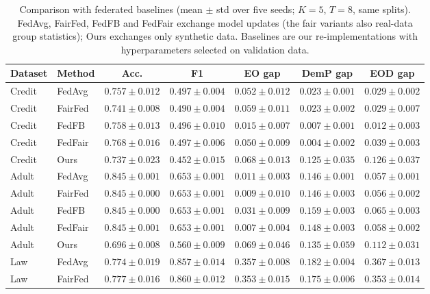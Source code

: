 \begin{table}[!t]
\caption{Comparison with federated baselines (mean \(\pm\) std over five seeds; \(K{=}5\), \(T{=}8\), same splits). FedAvg, FairFed, FedFB and FedFair exchange model updates (the fair variants also real-data group statistics); Ours exchanges only synthetic data. Baselines are our re-implementations with hyperparameters selected on validation data.}
\label{tab:fl-baselines}
\centering
\small
\begin{tabular}{@{}llccccc@{}}
\toprule
\textbf{Dataset} & \textbf{Method} & \textbf{Acc.} & \textbf{F1} & \textbf{EO gap} & \textbf{DemP gap} & \textbf{EOD gap} \\
\midrule
Credit & FedAvg & \(0.757\pm0.012\) & \(0.497\pm0.004\) & \(0.052\pm0.012\) & \(0.023\pm0.001\) & \(0.029\pm0.002\) \\
Credit & FairFed & \(0.741\pm0.008\) & \(0.490\pm0.004\) & \(0.059\pm0.011\) & \(0.023\pm0.002\) & \(0.029\pm0.007\) \\
Credit & FedFB & \(0.758\pm0.013\) & \(0.496\pm0.010\) & \(0.015\pm0.007\) & \(0.007\pm0.001\) & \(0.012\pm0.003\) \\
Credit & FedFair & \(0.768\pm0.016\) & \(0.497\pm0.006\) & \(0.050\pm0.009\) & \(0.004\pm0.002\) & \(0.039\pm0.003\) \\
Credit & Ours & \(0.737\pm0.023\) & \(0.452\pm0.015\) & \(0.068\pm0.013\) & \(0.125\pm0.035\) & \(0.126\pm0.037\) \\
\midrule
Adult & FedAvg & \(0.845\pm0.001\) & \(0.653\pm0.001\) & \(0.011\pm0.003\) & \(0.146\pm0.001\) & \(0.057\pm0.001\) \\
Adult & FairFed & \(0.845\pm0.000\) & \(0.653\pm0.001\) & \(0.009\pm0.010\) & \(0.146\pm0.003\) & \(0.056\pm0.002\) \\
Adult & FedFB & \(0.845\pm0.000\) & \(0.653\pm0.001\) & \(0.031\pm0.009\) & \(0.159\pm0.003\) & \(0.065\pm0.003\) \\
Adult & FedFair & \(0.845\pm0.001\) & \(0.653\pm0.001\) & \(0.007\pm0.004\) & \(0.148\pm0.003\) & \(0.058\pm0.002\) \\
Adult & Ours & \(0.696\pm0.008\) & \(0.560\pm0.009\) & \(0.069\pm0.046\) & \(0.135\pm0.059\) & \(0.112\pm0.031\) \\
\midrule
Law & FedAvg & \(0.774\pm0.019\) & \(0.857\pm0.014\) & \(0.357\pm0.008\) & \(0.182\pm0.004\) & \(0.367\pm0.013\) \\
Law & FairFed & \(0.777\pm0.016\) & \(0.860\pm0.012\) & \(0.353\pm0.015\) & \(0.175\pm0.006\) & \(0.353\pm0.014\) \\

\end{tabular}
\end{table}
